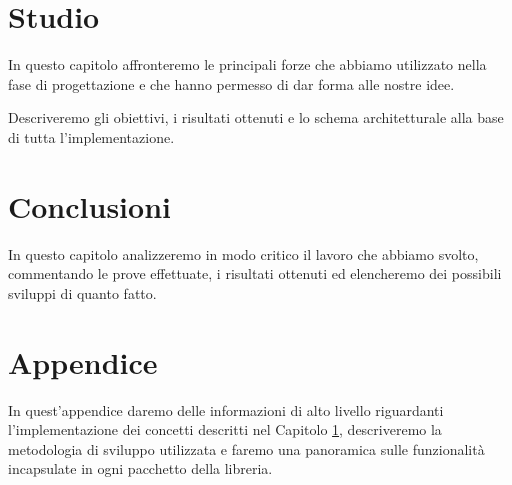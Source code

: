 \documentclass[twoside,openright,titlepage,fleqn,
	headinclude,11pt,a4paper,BCOR5mm,footinclude
	]{scrbook}
\begin{document}
\frenchspacing
\raggedbottom
{}
\pagestyle{plain}

\pagestyle{scrheadings}

\lstset{
	language = java
	, numbers = left 
	, basicstyle=\sffamily%
	, tabsize=2
	, captionpos=b
	, breaklines=true
	, showspaces=false
	, showstringspaces=false
}

\tableofcontents

% 

% 

% 
\newpage




\chapter{Studio}
\label{chapter:study}

In questo capitolo affronteremo le principali forze che abbiamo
utilizzato nella fase di progettazione e che hanno permesso di dar
forma alle nostre idee.

Descriveremo gli obiettivi, i risultati ottenuti e lo schema
architetturale alla base di tutta l'implementazione.

% 

% 



\chapter{Conclusioni}
In questo capitolo analizzeremo in modo critico il lavoro che abbiamo
svolto, commentando le prove effettuate, i risultati ottenuti ed
elencheremo dei possibili sviluppi di quanto fatto.
\label{chapter:conclusions}



\chapter{Appendice}
\label{chapter:implementation}
In quest'appendice daremo delle informazioni di alto livello
riguardanti l'implementazione dei concetti descritti nel Capitolo
\ref{chapter:study}, descriveremo la metodologia di sviluppo
utilizzata e faremo una panoramica sulle funzionalit\`a incapsulate in
ogni pacchetto della libreria.
\end{document}
